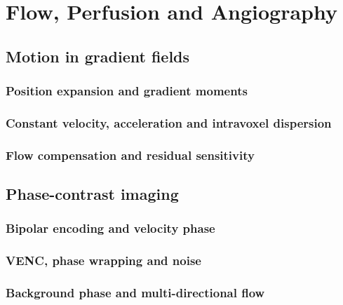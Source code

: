 \chapter{Flow, Perfusion and Angiography}
\label{ch:19}

\section{Motion in gradient fields}
\label{sec:19:motion-in-gradient-fields}
\subsection{Position expansion and gradient moments}
\subsection{Constant velocity, acceleration and intravoxel dispersion}
\subsection{Flow compensation and residual sensitivity}

\section{Phase-contrast imaging}
\label{sec:19:phase-contrast-imaging}
\subsection{Bipolar encoding and velocity phase}
\subsection{VENC, phase wrapping and noise}
\subsection{Background phase and multi-directional flow}

